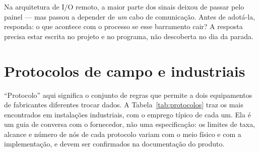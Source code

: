 \begin{atencao}
Na arquitetura de I/O remoto, a maior parte dos sinais deixou de passar pelo painel --- mas passou a
depender de \emph{um} cabo de comunicação. Antes de adotá-la, responda: o que acontece com o processo
se esse barramento cair? A resposta precisa estar escrita no projeto e no programa, não descoberta
no dia da parada.
\end{atencao}

\section{Protocolos de campo e industriais}

``Protocolo'' aqui significa o conjunto de regras que permite a dois equipamentos de fabricantes
diferentes trocar dados. A Tabela~\ref{tab:protocolos} traz os mais encontrados em instalações
industriais, com o emprego típico de cada um. Ela é um guia de conversa com o fornecedor, não uma
especificação: os limites de taxa, alcance e número de nós de cada protocolo variam com o meio físico
e com a implementação, e devem ser confirmados na documentação do produto.

